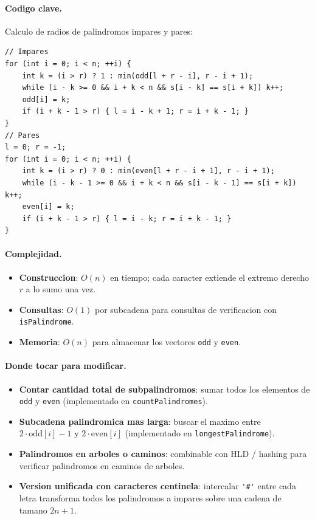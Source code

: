 \paragraph{Codigo clave.}
Calculo de radios de palindromos impares y pares:
\begin{verbatim}
// Impares
for (int i = 0; i < n; ++i) {
    int k = (i > r) ? 1 : min(odd[l + r - i], r - i + 1);
    while (i - k >= 0 && i + k < n && s[i - k] == s[i + k]) k++;
    odd[i] = k;
    if (i + k - 1 > r) { l = i - k + 1; r = i + k - 1; }
}
// Pares
l = 0; r = -1;
for (int i = 0; i < n; ++i) {
    int k = (i > r) ? 0 : min(even[l + r - i + 1], r - i + 1);
    while (i - k - 1 >= 0 && i + k < n && s[i - k - 1] == s[i + k]) k++;
    even[i] = k;
    if (i + k - 1 > r) { l = i - k; r = i + k - 1; }
}
\end{verbatim}

\paragraph{Complejidad.}
\begin{itemize}\setlength\itemsep{0pt}
	\item \textbf{Construccion}: $O(n)$ en tiempo; cada caracter extiende el extremo derecho $r$ a lo sumo una vez.
	\item \textbf{Consultas}: $O(1)$ por subcadena para consultas de verificacion con \verb|isPalindrome|.
	\item \textbf{Memoria}: $O(n)$ para almacenar los vectores \verb|odd| y \verb|even|.
\end{itemize}

\paragraph{Donde tocar para modificar.}
\begin{itemize}\setlength\itemsep{0pt}
	\item \textbf{Contar cantidad total de subpalindromos}: sumar todos los elementos de \verb|odd| y \verb|even| (implementado en \verb|countPalindromes|).
	\item \textbf{Subcadena palindromica mas larga}: buscar el maximo entre $2 \cdot \text{odd}[i] - 1$ y $2 \cdot \text{even}[i]$ (implementado en \verb|longestPalindrome|).
	\item \textbf{Palindromos en arboles o caminos}: combinable con HLD / hashing para verificar palindromos en caminos de arboles.
	\item \textbf{Version unificada con caracteres centinela}: intercalar \verb|'#'| entre cada letra transforma todos los palindromos a impares sobre una cadena de tamano $2n + 1$.
\end{itemize}

